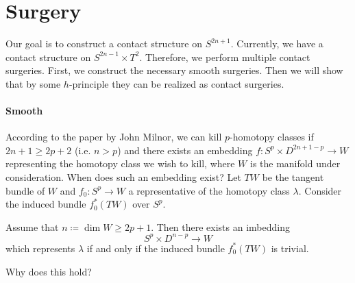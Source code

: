 \section*{Surgery}
Our goal is to construct a contact structure on $S^{2n+1}$. 
Currently, we have a contact structure on $S^{2n-1} \times T^2$.
Therefore, we perform multiple contact surgeries.
First, we construct the necessary smooth surgeries. 
Then we will show that by some $h$-principle they can be realized as contact surgeries.

\paragraph*{Smooth}
According to the paper by John Milnor, we can kill $p$-homotopy classes
if $2n + 1 \geq 2p + 2$  (i.e. $n > p$) and there exists an embedding $f: S^p \times D^{2n+1-p} \to W$ 
representing the homotopy class we wish to kill, where $W$ is the manifold under consideration.
When does such an embedding exist?
Let $TW$ be the tangent bundle of $W$ and $f_0\colon S^p \to W$ a representative of the homotopy class $\lambda$. Consider the induced bundle $f_0^*(TW)$ over $S^p$.
\begin{lemma} %
    Assume that $n \coloneqq \dim W \geq 2p+1$. Then there exists an imbedding
    \[
        S^p \times D^{n-p} \to W
    \]
    which represents $\lambda$ if and only if the induced bundle $f_0^*(TW)$ is trivial.
\end{lemma}
Why does this hold?